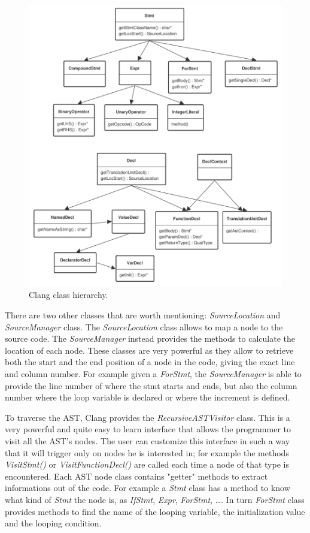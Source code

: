 \documentclass[a4paper,11pt,oneside]{book}
\begin{document}
\begin{figure}[H]
\centering
\includegraphics[scale=0.6]{clang_classes.pdf}
\caption{Clang class hierarchy.}
\end{figure}

There are two other classes that are worth mentioning: \emph{SourceLocation} and \emph{SourceManager} class. The \emph{SourceLocation} class allows to map a node to the source code. The \emph{SourceManager} instead provides the methods to calculate the location of each node. These classes are very powerful as they allow to retrieve both the start and the end position of a node in the code, giving the exact line and column number. For example given a \emph{ForStmt}, the \emph{SourceManager} is able to provide the line number of where the stmt starts and ends, but also the column number where the loop variable is declared or where the increment is defined.

To traverse the AST, Clang provides the \emph{RecursiveASTVisitor} class. This is a very powerful and quite easy to learn interface that allows the programmer to visit all the AST’s nodes. The user can customize this interface in such a way that it will trigger only on nodes he is interested in; for example the methods \emph{VisitStmt()} or \emph{VisitFunctionDecl()} are called each time a node of that type is encountered. Each AST node class contains "getter" methods to extract informations out of the code. For example a \emph{Stmt} class has a method to know what kind of \emph{Stmt} the node is, as \emph{IfStmt}, \emph{Expr}, \emph{ForStmt}, \dots. In turn \emph{ForStmt} class provides methods to find the name of the looping variable, the initialization value and the looping condition.
\end{document}
